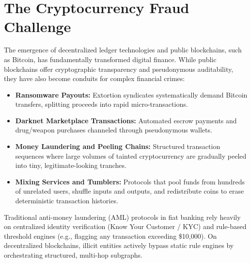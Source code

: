 \documentclass[11pt,a4paper]{report}
\begin{document}
\section{The Cryptocurrency Fraud Challenge}
The emergence of decentralized ledger technologies and public blockchains, such as Bitcoin, has fundamentally transformed digital finance. While public blockchains offer cryptographic transparency and pseudonymous auditability, they have also become conduits for complex financial crimes:
\begin{itemize}[leftmargin=1.5em]
  \item \textbf{Ransomware Payouts:} Extortion syndicates systematically demand Bitcoin transfers, splitting proceeds into rapid micro-transactions.
  \item \textbf{Darknet Marketplace Transactions:} Automated escrow payments and drug/weapon purchases channeled through pseudonymous wallets.
  \item \textbf{Money Laundering and Peeling Chains:} Structured transaction sequences where large volumes of tainted cryptocurrency are gradually peeled into tiny, legitimate-looking tranches.
  \item \textbf{Mixing Services and Tumblers:} Protocols that pool funds from hundreds of unrelated users, shuffle inputs and outputs, and redistribute coins to erase deterministic transaction histories.
\end{itemize}

Traditional anti-money laundering (AML) protocols in fiat banking rely heavily on centralized identity verification (Know Your Customer / KYC) and rule-based threshold engines (e.g., flagging any transaction exceeding \$10,000). On decentralized blockchains, illicit entities actively bypass static rule engines by orchestrating structured, multi-hop subgraphs.
\end{document}
